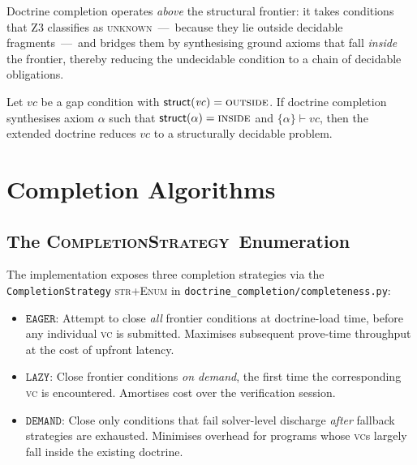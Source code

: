 \documentclass[11pt]{article}
\newcommand{\VC}{\mathit{vc}}             %
\newcommand{\EAGER}{\texttt{EAGER}}
\newcommand{\LAZY}{\texttt{LAZY}}
\newcommand{\DEMAND}{\texttt{DEMAND}}
\newcommand{\CompStrat}{\textsc{CompletionStrategy}}
\begin{document}
Doctrine completion operates \emph{above} the structural frontier: it
takes conditions that Z3 classifies as \textsc{unknown}~---~because they
lie outside decidable fragments~---~and bridges them by synthesising
ground axioms that fall \emph{inside} the frontier, thereby reducing the
undecidable condition to a chain of decidable obligations.

\begin{proposition}\label{prop:frontier-reduction}
Let $\VC$ be a gap condition with $\mathsf{struct}(\VC) = \textsc{outside}$.
If doctrine completion synthesises axiom $\alpha$ such that
$\mathsf{struct}(\alpha) = \textsc{inside}$ and
$\{\alpha\} \vdash \VC$, then the extended doctrine reduces $\VC$ to
a structurally decidable problem.
\end{proposition}

\section{Completion Algorithms}\label{sec:completion}

\subsection{The \CompStrat\ Enumeration}

The implementation exposes three completion strategies via the
\texttt{CompletionStrategy} \textsc{str}+\textsc{Enum} in
\texttt{doctrine\_completion/completeness.py}:

\begin{definition}[\CompStrat]\label{def:strategy}
\begin{itemize}[leftmargin=2em]
  \item $\EAGER$: Attempt to close \emph{all} frontier conditions at
        doctrine-load time, before any individual \textsc{vc} is
        submitted.  Maximises subsequent prove-time throughput at the
        cost of upfront latency.
  \item $\LAZY$: Close frontier conditions \emph{on demand}, the first
        time the corresponding \textsc{vc} is encountered.  Amortises
        cost over the verification session.
  \item $\DEMAND$: Close only conditions that fail solver-level
        discharge \emph{after} fallback strategies are exhausted.
        Minimises overhead for programs whose \textsc{vc}s largely
        fall inside the existing doctrine.
\end{itemize}
\end{definition}
\end{document}
